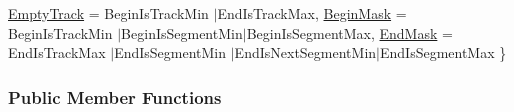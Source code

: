 \begin{DoxyCompactItemize}
\hyperlink{classKite_1_1Track_af4bdc8469c0fee386fc2ff30e0666bcaaa697b71e325cea0980e9555654f8f3cf}{Empty\+Track} = Begin\+Is\+Track\+Min $\vert$\+End\+Is\+Track\+Max, 
\newline
\hyperlink{classKite_1_1Track_af4bdc8469c0fee386fc2ff30e0666bcaa8621fa6a5b7a491fd1bf8dd7f0dd3589}{Begin\+Mask} = Begin\+Is\+Track\+Min $\vert$\+Begin\+Is\+Segment\+Min$\vert$\+Begin\+Is\+Segment\+Max, 
\newline
\hyperlink{classKite_1_1Track_af4bdc8469c0fee386fc2ff30e0666bcaa0b5a81972d3a6718c3d68199467d2d11}{End\+Mask} = End\+Is\+Track\+Max $\vert$\+End\+Is\+Segment\+Min $\vert$\+End\+Is\+Next\+Segment\+Min$\vert$\+End\+Is\+Segment\+Max
 \}
\end{DoxyCompactItemize}
\subsubsection*{Public Member Functions}
